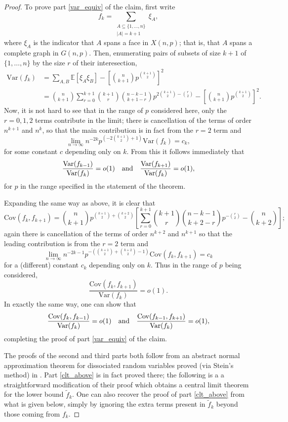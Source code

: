 \documentclass{amsart}
\theoremstyle{definition}
\newcommand{\E}{\mathbb{E}}
\newcommand{\var}{\mathrm{Var}}
\newcommand{\cov}{\mathrm{Cov}}
\renewcommand{\1}{\mathbb{1}}
\begin{document}
\begin{proof}
To prove part \ref{var_equiv} of the claim, first write 
$$f_k=\sum_{\substack{A\subseteq\{1,\ldots,n\}\\|A|=k+1}}\xi_A,$$
where $\xi_A$ is the indicator that $A$ spans a face in $X(n,p)$; that
is, that $A$ spans a complete graph in $G(n,p)$.  Then, enumerating
pairs of subsets of size $k+1$ of $\{1,\ldots,n\}$ by the size $r$ of 
their interesection,
\begin{equation*}\begin{split}
\var(f_k)&=\sum_{A,B}\E[\xi_A\xi_B]-\left[\binom{n}{k+1}p^{\binom{k+1}{2}}
\right]^2\\&=\binom{n}{k+1}\sum_{r=0}^{k+1}\binom{k+1}{r}\binom{n-k-1}{k+1-r}
p^{2\binom{k+1}{2}-\binom{r}{2}}-\left[\binom{n}{k+1}p^{\binom{k+1}{2}}
\right]^2.
\end{split}\end{equation*}
Now, it is not
hard to see that in the range of $p$ considered here, only the $r=0,1,2$
terms contribute in the limit; there is cancellation of the terms
of order $n^{k+1}$ and $n^k$, so that the main contribution is
in fact from the $r=2$ term and 
\begin{equation}\label{f_k_var}\lim_{n\to\infty}n^{-2k}p^{(-2\binom{k+1}{2}+1)}\var(f_k)=c_k,\end{equation}
for some constant $c$ depending only on $k$.  From this it follows immediately
that 
$$\frac{\var(f_{k-1})}{\var(f_{k})}=o(1)\quad{\rm and}\quad
\frac{\var(f_{k+1})}{\var(f_{k})}=o(1),$$
for $p$ in the range specified in the statement of the theorem.

Expanding the same way as above, it is clear that 
$$\cov(f_k,f_{k+1})=\binom{n}{k+1}p^{\binom{k+1}{2}+ \binom{k+2}{2}}
\left[\sum_{r=0}^{k+1}\binom{k+1}{r}\binom{n-k-1}{k+2-r}p^{-\binom{r}{2}}-
\binom{n}{k+2}\right];$$
again there is cancellation of the terms of order $n^{k+2}$
and $n^{k+1}$ so that the leading contribution is from the $r=2$ term
and 
$$\lim_{n\to\infty}n^{-2k-1}p^{-\left(\binom{k+1}{2}+ \binom{k+2}{2}-1\right)}
\cov(f_k,f_{k+1})=c_k$$
for a (different) constant $c_k$ depending only on $k$.  Thus in the 
range of $p$ being considered,
$$\frac{\cov(f_k,f_{k+1})}{\var(f_k)}=o(1).$$
In exactly the same way, one can show that
$$\frac{\cov(f_k,f_{k-1})}{\var(f_k)}=o(1)\quad{\rm and}\quad
 \frac{\cov(f_{k-1},f_{k+1})}{\var(f_k)}=o(1),$$
completing the proof of part \ref{var_equiv} of the claim.

\smallskip

The proofs of the second and third parts both
follow from an abstract normal approximation theorem for
dissociated random variables proved (via Stein's method) in \cite{BKR}.
Part \ref{clt_above} is in fact proved there; the following is a 
a straightforward modification of their proof which obtains a central
limit theorem for the lower bound $\tilde{f}_k$.  One 
can also recover the proof of part \ref{clt_above} from what is
given below, simply by ignoring the extra terms present in $\tilde{f}_k$
beyond those coming from $f_k$.


\end{proof}
\end{document}
